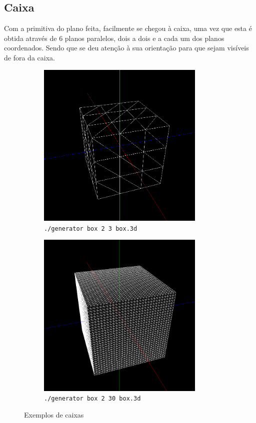 \documentclass[11pt,a4paper]{report}
\begin{document}
\newpage
\subsection{Caixa}
\vspace{0.5cm}
Com a primitiva do plano feita, facilmente se chegou à caixa, uma vez que esta é obtida através de 6 planos paralelos, dois a dois e a cada um dos planos coordenados. Sendo que se deu atenção à sua orientação para que sejam visíveis de fora da caixa.
\vspace{1cm}
\begin{figure}[H]
\centering
\begin{subfigure}{0.5\textwidth}
  \centering
  \includegraphics[width = 8cm,height = 8cm]{caixa1.png}
  \caption{\texttt{./generator box 2 3 box.3d}}
  \label{fig:caixa1}
\end{subfigure}%
\begin{subfigure}{0.5\textwidth}
  \centering
  \includegraphics[width = 8cm,height = 8cm]{caixa2.png}
  \caption{\texttt{./generator box 2 30 box.3d}}
  \label{fig:caixa2}
\end{subfigure}
\caption{Exemplos de caixas}
\label{fig:caixa}
\end{figure}
\newpage
\end{document}
